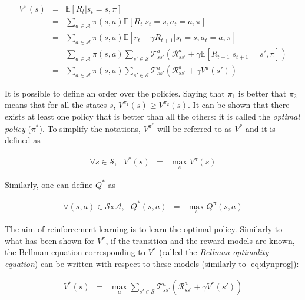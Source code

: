 			\begin{eqnarray}
					V^{\pi} (s)   & = & \mathbb{E} [R_t | s_t = s, \pi] \nonumber \\
					& = & \sum_{a \in \mathcal{A}} \pi (s,a) \mathbb{E} [R_t | s_t = s, a_t = a, \pi] \nonumber \\
					& = & \sum_{a \in \mathcal{A}} \pi (s,a) \mathbb{E} [r_t + \gamma R_{t+1} | s_t = s, a_t = a, \pi] \nonumber \\
					& = & \sum_{a \in \mathcal{A}} \pi (s,a)  \sum_{s' \in \mathcal{S}} \mathscr{T}_{ss'}^a (\mathscr{R}_{ss'}^a + \gamma \mathbb{E} [R_{t+1} | s_{t+1} = s', \pi]) \nonumber \\
					& = & \sum_{a \in \mathcal{A}} \pi (s,a)  \sum_{s' \in \mathcal{S}} \mathscr{T}_{ss'}^a (\mathscr{R}_{ss'}^a + \gamma V^{\pi} (s')) \label{eq:dynprog}
			\end{eqnarray}
					
			It is possible to define an order over the policies. Saying that $\pi_1$ is better that $\pi_2$ means that for all the states $s$, $V^{\pi_1} (s) \geq V^{\pi_2} (s)$. It can be shown that there exists at least one policy that is better than all the others: it is called the \textit{optimal policy} ($\pi^*$). To simplify the notations, $V^{\pi^*}$ will be referred to as $V^*$ and it is defined as
				
				\begin{eqnarray}
					\forall s \in \mathcal{S}, \text{ } V^* (s) & = & \max_\pi V^\pi (s) \label{eq:voptim}
				\end{eqnarray}
					
			Similarly, one can define $Q^*$ as
				
				\begin{eqnarray}
					\forall (s,a) \in \mathcal{S} \text{x} \mathcal{A}, \text{ } Q^*(s,a) & = & \max_\pi Q^{\pi}(s,a) \label{eq:qoptim}
				\end{eqnarray}

			The aim of reinforcement learning is to learn the optimal policy. Similarly to what has been shown for $V^{\pi}$, if the transition and the reward models are known, the Bellman equation corresponding to $V^*$ (called the \textit{Bellman optimality equation}) can be written with respect to these models (similarly to \ref{eq:dynprog}):
							
				\begin{eqnarray}
					V^*(s) & = & \max_a \sum_{s' \in \mathcal{S}} \mathscr{T}_{ss'}^a (\mathscr{R}_{ss'}^a + \gamma V^*(s')) \label{eq:vbellmanoptim}
				\end{eqnarray}
			
